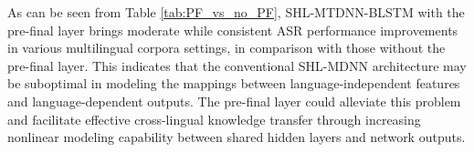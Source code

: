 \documentclass[a4paper]{article}
\begin{document}
As can be seen from  Table \ref{tab:PF_vs_no_PF},
 SHL-MTDNN-BLSTM with the pre-final layer brings moderate while consistent  ASR performance improvements in various multilingual corpora settings,
 in comparison with those without the pre-final layer. This indicates that
 the conventional SHL-MDNN architecture
 may be suboptimal in modeling the mappings between language-independent features and language-dependent outputs.
 The pre-final layer could alleviate this problem and facilitate effective cross-lingual knowledge transfer through increasing nonlinear modeling capability between shared hidden layers and network outputs.

\end{document}
